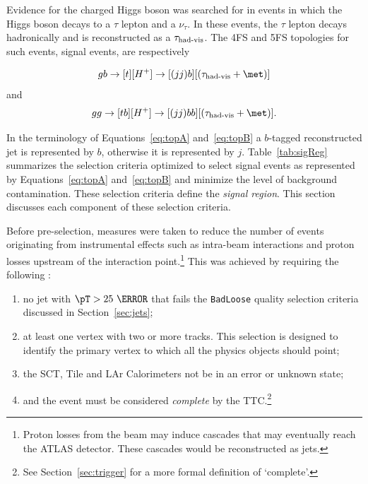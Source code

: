\par Evidence for the charged Higgs boson was searched for in events in which the Higgs boson 
decays to a $\tau$ lepton and a $\nu_\tau$. In these events, the $\tau$ lepton decays hadronically 
and is reconstructed as a $\tau_{\text{had-vis}}$. The 4FS and 5FS topologies for such events, signal events, are 
respectively  

\begin{equation}
gb\to[t][H^+]\to[(jj)b][(\tauvis+\met)]
\label{eq:topA}
\end{equation} 
and 
\begin{equation}
gg\to[tb][H^+]\to[(jj)bb][(\tauvis+\met)].
\label{eq:topB}
\end{equation}

In the terminology of Equations~\ref{eq:topA} and~\ref{eq:topB} a $b$-tagged reconstructed jet 
is represented by $b$, otherwise it is represented by $j$. 
Table~\ref{tab:sigReg} summarizes the selection criteria optimized to select signal events as represented by 
 Equations~\ref{eq:topA} and~\ref{eq:topB} and minimize the level of background contamination. These 
selection criteria define the {\it signal region}. This section 
discusses each component of these selection criteria.  

\par Before pre-selection, measures were taken to reduce the number of events originating 
from instrumental effects such as intra-beam interactions and proton losses upstream of the 
interaction point.\footnote{Proton losses from the beam may induce cascades that may 
eventually reach the ATLAS detector. These cascades would be reconstructed as jets.} 
 This was achieved by requiring the following :

\begin{enumerate}
\item no jet with $\pT>25~\GeV$ that fails 
the \texttt{BadLoose} quality selection criteria discussed in Section~\ref{sec:jets}; 
\item at least one vertex with two or more tracks. This selection is designed to identify the primary 
vertex to which all the physics objects should point; 
\item the SCT, Tile and LAr Calorimeters not be in an error or unknown state; 
\item and the event must be considered {\it complete} by the TTC.\footnote{See Section~\ref{sec:trigger} 
for a more formal definition of `complete'.}
\end{enumerate}


